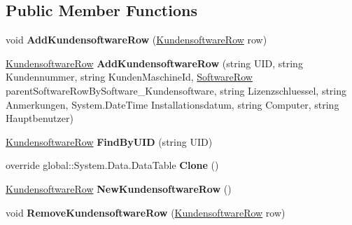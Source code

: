 \subsection*{Public Member Functions}
\begin{DoxyCompactItemize}
\item 
void {\bfseries Add\+Kundensoftware\+Row} (\hyperlink{class_products_1_1_data_1_1ds_sage_1_1_kundensoftware_row}{Kundensoftware\+Row} row)\hypertarget{class_products_1_1_data_1_1ds_sage_1_1_kundensoftware_data_table_ad544aaa68434df867ff76a21b51c0c60}{}\label{class_products_1_1_data_1_1ds_sage_1_1_kundensoftware_data_table_ad544aaa68434df867ff76a21b51c0c60}

\item 
\hyperlink{class_products_1_1_data_1_1ds_sage_1_1_kundensoftware_row}{Kundensoftware\+Row} {\bfseries Add\+Kundensoftware\+Row} (string U\+ID, string Kundennummer, string Kunden\+Maschine\+Id, \hyperlink{class_products_1_1_data_1_1ds_sage_1_1_software_row}{Software\+Row} parent\+Software\+Row\+By\+Software\+\_\+\+Kundensoftware, string Lizenzschluessel, string Anmerkungen, System.\+Date\+Time Installationsdatum, string Computer, string Hauptbenutzer)\hypertarget{class_products_1_1_data_1_1ds_sage_1_1_kundensoftware_data_table_a2133a272e624e3eb6edb0df012ed66cf}{}\label{class_products_1_1_data_1_1ds_sage_1_1_kundensoftware_data_table_a2133a272e624e3eb6edb0df012ed66cf}

\item 
\hyperlink{class_products_1_1_data_1_1ds_sage_1_1_kundensoftware_row}{Kundensoftware\+Row} {\bfseries Find\+By\+U\+ID} (string U\+ID)\hypertarget{class_products_1_1_data_1_1ds_sage_1_1_kundensoftware_data_table_a5658bf2a1d9a78296abdc73170420f5b}{}\label{class_products_1_1_data_1_1ds_sage_1_1_kundensoftware_data_table_a5658bf2a1d9a78296abdc73170420f5b}

\item 
override global\+::\+System.\+Data.\+Data\+Table {\bfseries Clone} ()\hypertarget{class_products_1_1_data_1_1ds_sage_1_1_kundensoftware_data_table_a3a2a14460ddace5a6e020ea1897936fb}{}\label{class_products_1_1_data_1_1ds_sage_1_1_kundensoftware_data_table_a3a2a14460ddace5a6e020ea1897936fb}

\item 
\hyperlink{class_products_1_1_data_1_1ds_sage_1_1_kundensoftware_row}{Kundensoftware\+Row} {\bfseries New\+Kundensoftware\+Row} ()\hypertarget{class_products_1_1_data_1_1ds_sage_1_1_kundensoftware_data_table_aecbca1cc0ea8cec886820f7ded6e35d0}{}\label{class_products_1_1_data_1_1ds_sage_1_1_kundensoftware_data_table_aecbca1cc0ea8cec886820f7ded6e35d0}

\item 
void {\bfseries Remove\+Kundensoftware\+Row} (\hyperlink{class_products_1_1_data_1_1ds_sage_1_1_kundensoftware_row}{Kundensoftware\+Row} row)\hypertarget{class_products_1_1_data_1_1ds_sage_1_1_kundensoftware_data_table_aaa616d1b7bbcb7a71fdc39dc66853534}{}\label{class_products_1_1_data_1_1ds_sage_1_1_kundensoftware_data_table_aaa616d1b7bbcb7a71fdc39dc66853534}

\end{DoxyCompactItemize}
